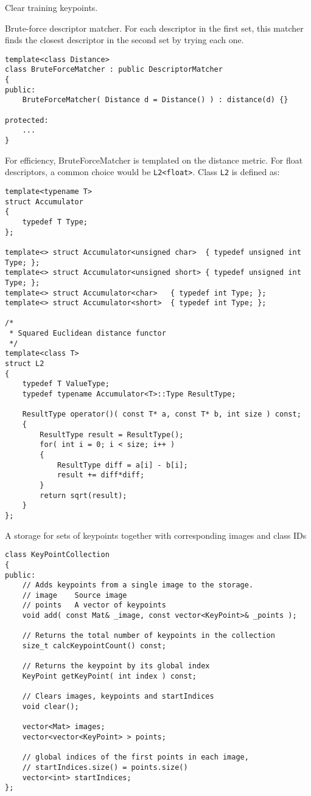 Clear training keypoints.


Brute-force descriptor matcher. For each descriptor in the first set, this matcher finds the closest
descriptor in the second set by trying each one.

\begin{lstlisting}
template<class Distance>
class BruteForceMatcher : public DescriptorMatcher
{
public:
    BruteForceMatcher( Distance d = Distance() ) : distance(d) {}

protected:
    ...
}
\end{lstlisting}

For efficiency, BruteForceMatcher is templated on the distance metric.
For float descriptors, a common choice would be \texttt{L2<float>}. Class \texttt{L2} is defined as:
\begin{lstlisting}
template<typename T>
struct Accumulator
{
    typedef T Type;
};

template<> struct Accumulator<unsigned char>  { typedef unsigned int Type; };
template<> struct Accumulator<unsigned short> { typedef unsigned int Type; };
template<> struct Accumulator<char>   { typedef int Type; };
template<> struct Accumulator<short>  { typedef int Type; };

/*
 * Squared Euclidean distance functor
 */
template<class T>
struct L2
{
    typedef T ValueType;
    typedef typename Accumulator<T>::Type ResultType;

    ResultType operator()( const T* a, const T* b, int size ) const;
    {
        ResultType result = ResultType();
        for( int i = 0; i < size; i++ )
        {
            ResultType diff = a[i] - b[i];
            result += diff*diff;
        }
        return sqrt(result);
    }
};
\end{lstlisting}

A storage for sets of keypoints together with corresponding images and class IDs

\begin{lstlisting}
class KeyPointCollection
{
public:
    // Adds keypoints from a single image to the storage.
    // image    Source image
    // points   A vector of keypoints
    void add( const Mat& _image, const vector<KeyPoint>& _points );

    // Returns the total number of keypoints in the collection
    size_t calcKeypointCount() const;

    // Returns the keypoint by its global index
    KeyPoint getKeyPoint( int index ) const;

    // Clears images, keypoints and startIndices
    void clear();

    vector<Mat> images;
    vector<vector<KeyPoint> > points;

    // global indices of the first points in each image,
    // startIndices.size() = points.size()
    vector<int> startIndices;
};
\end{lstlisting}

